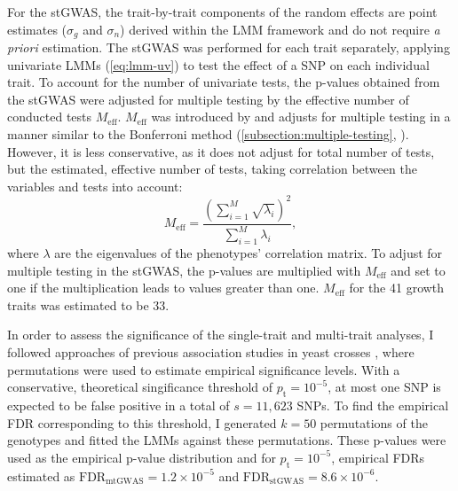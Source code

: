 For the stGWAS, the trait-by-trait components of the random effects are point estimates (\(\sigma_g\) and \(\sigma_n\)) derived within the LMM framework and do not require \textit{a priori} estimation. The stGWAS was performed for each trait separately, applying univariate LMMs (\cref{eq:lmm-uv}) to test the effect of a SNP on each individual trait. To account for the number of univariate tests, the p-values obtained from the stGWAS were adjusted for multiple testing by the effective number of conducted tests \(M_\text{eff}\). \(M_\text{eff}\) was introduced by \citet{Galwey2009} and adjusts for multiple testing in a manner similar to the Bonferroni method (\cref{subsection:multiple-testing}, \citep{Dunn1961}). However, it is less conservative, as it does not adjust for total number of tests, but the estimated, effective number of tests, taking correlation between the 
variables and tests into account:
\begin{equation}
 M_\text{eff} = \frac{(\sum^M_{i=1} \sqrt{\lambda_i})^2}{\sum^M_{i=1}\lambda_i},
 \label{eq:meff}
\end{equation}
 where \(\lambda\) are the eigenvalues of the phenotypes' correlation matrix. To adjust for multiple testing in the stGWAS, the p-values are multiplied with \(M_\text{eff}\) and set to one if the multiplication leads to values greater than one. \(M_\text{eff}\) for the \num{41} growth traits was estimated to be \num{33}. 
 
In order to assess the significance of the single-trait and multi-trait analyses, I followed approaches of previous association studies in yeast crosses \citep{Brem2002,Brem2005,Ehrenreich2010}, where permutations were used to estimate empirical significance levels. With a conservative, theoretical singificance threshold of \(p_\text{t}=10^{-5}\), at most one SNP is expected to be false positive in a total of \(s = 11,623\) SNPs. To find the empirical FDR corresponding to this threshold, I generated \(k = 50\) permutations of the genotypes and fitted the LMMs against these permutations. These p-values were used as the empirical p-value distribution and for \(p_\text{t}=10^{-5}\), empirical FDRs estimated as 
\(\text{FDR}_{\text{mtGWAS}} =1.2 \times 10^{-5}\) and \(\text{FDR}_{\text{stGWAS}} =8.6 \times 10^{-6}\).

